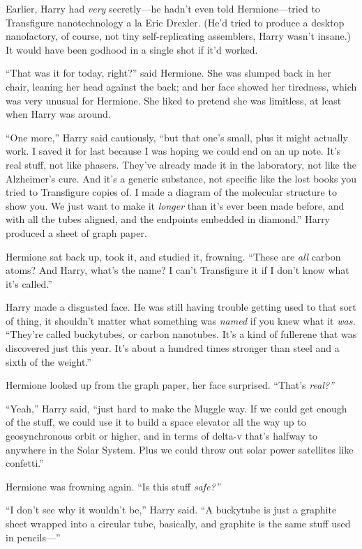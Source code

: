 Earlier, Harry had \emph{very} secretly---he hadn't even told
Hermione---tried to Transfigure nanotechnology a la Eric Drexler. (He'd
tried to produce a desktop nanofactory, of course, not tiny
self-replicating assemblers, Harry wasn't insane.) It would have been
godhood in a single shot if it'd worked.

``That was it for today, right?'' said Hermione. She was slumped back in
her chair, leaning her head against the back; and her face showed her
tiredness, which was very unusual for Hermione. She liked to pretend she
was limitless, at least when Harry was around.

``One more,'' Harry said cautiously, ``but that one's small, plus it
might actually work. I saved it for last because I was hoping we could
end on an up note. It's real stuff, not like phasers. They've already
made it in the laboratory, not like the Alzheimer's cure. And it's a
generic substance, not specific like the lost books you tried to
Transfigure copies of. I made a diagram of the molecular structure to
show you. We just want to make it \emph{longer} than it's ever been made
before, and with all the tubes aligned, and the endpoints embedded in
diamond.'' Harry produced a sheet of graph paper.

Hermione sat back up, took it, and studied it, frowning. ``These are
\emph{all} carbon atoms? And Harry, what's the name? I can't Transfigure
it if I don't know what it's called.''

Harry made a disgusted face. He was still having trouble getting used to
that sort of thing, it shouldn't matter what something was \emph{named}
if you knew what it \emph{was.} ``They're called buckytubes, or carbon
nanotubes. It's a kind of fullerene that was discovered just this year.
It's about a hundred times stronger than steel and a sixth of the
weight.''

Hermione looked up from the graph paper, her face surprised. ``That's
\emph{real?''}

``Yeah,'' Harry said, ``just hard to make the Muggle way. If we could
get enough of the stuff, we could use it to build a space elevator all
the way up to geosynchronous orbit or higher, and in terms of delta-v
that's halfway to anywhere in the Solar System. Plus we could throw out
solar power satellites like confetti.''

Hermione was frowning again. ``Is this stuff \emph{safe?''}

``I don't see why it wouldn't be,'' Harry said. ``A buckytube is just a
graphite sheet wrapped into a circular tube, basically, and graphite is
the same stuff used in pencils---''

